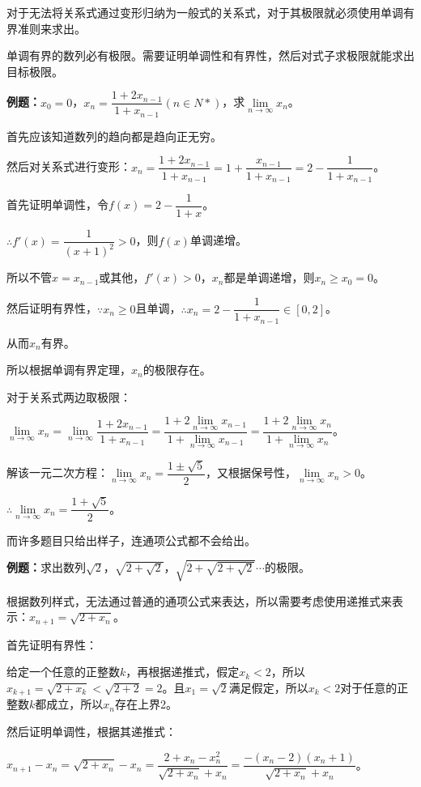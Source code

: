 \documentclass[UTF8, 12pt]{ctexart}
\begin{document}
对于无法将关系式通过变形归纳为一般式的关系式，对于其极限就必须使用单调有界准则来求出。

单调有界的数列必有极限。需要证明单调性和有界性，然后对式子求极限就能求出目标极限。

\textbf{例题：}$x_0=0$，$x_n=\dfrac{1+2x_{n-1}}{1+x_{n-1}}(n\in N*)$，求$\lim\limits_{n\to\infty}x_n$。\medskip

首先应该知道数列的趋向都是趋向正无穷。

然后对关系式进行变形：$x_n=\dfrac{1+2x_{n-1}}{1+x_{n-1}}=1+\dfrac{x_{n-1}}{1+x_{n-1}}=2-\dfrac{1}{1+x_{n-1}}$。

首先证明单调性，令$f(x)=2-\dfrac{1}{1+x}$。

$\therefore f'(x)=\dfrac{1}{(x+1)^2}>0$，则$f(x)$单调递增。

所以不管$x=x_{n-1}$或其他，$f'(x)>0$，$x_n$都是单调递增，则$x_n\geqslant x_0=0$。

然后证明有界性，$\because x_n\geqslant 0$且单调，$\therefore x_n=2-\dfrac{1}{1+x_{n-1}}\in[0,2]$。

从而$x_n$有界。

所以根据单调有界定理，$x_n$的极限存在。

对于关系式两边取极限：

$\lim\limits_{n\to\infty}x_n=\lim\limits_{n\to\infty}\dfrac{1+2x_{n-1}}{1+x_{n-1}}=\dfrac{1+2\lim\limits_{n\to\infty}x_{n-1}}{1+\lim\limits_{n\to\infty}x_{n-1}}=\dfrac{1+2\lim\limits_{n\to\infty}x_n}{1+\lim\limits_{n\to\infty}x_n}$。

解该一元二次方程：$\lim\limits_{n\to\infty}x_n=\dfrac{1\pm\sqrt{5}}{2}$，又根据保号性，$\lim\limits_{n\to\infty}x_n>0$。

$\therefore\lim\limits_{n\to\infty}x_n=\dfrac{1+\sqrt{5}}{2}$。

而许多题目只给出样子，连通项公式都不会给出。\medskip

\textbf{例题：}求出数列$\sqrt{2}$，$\sqrt{2+\sqrt{2}}$，$\sqrt{2+\sqrt{2+\sqrt{2}}}$$\cdots$的极限。

根据数列样式，无法通过普通的通项公式来表达，所以需要考虑使用递推式来表示：$x_{n+1}=\sqrt{2+x_n}$。

首先证明有界性：

给定一个任意的正整数$k$，再根据递推式，假定$x_k<2$，所以$x_{k+1}=\sqrt{2+x_k}<\sqrt{2+2}=2$。且$x_1=\sqrt{2}$满足假定，所以$x_k<2$对于任意的正整数$k$都成立，所以$x_n$存在上界2。

然后证明单调性，根据其递推式：

$x_{n+1}-x_n=\sqrt{2+x_n}-x_n=\dfrac{2+x_n-x_n^2}{\sqrt{2+x_n}+x_n}=\dfrac{-(x_n-2)(x_n+1)}{\sqrt{2+x_n}+x_n}$。\medskip
\end{document}
